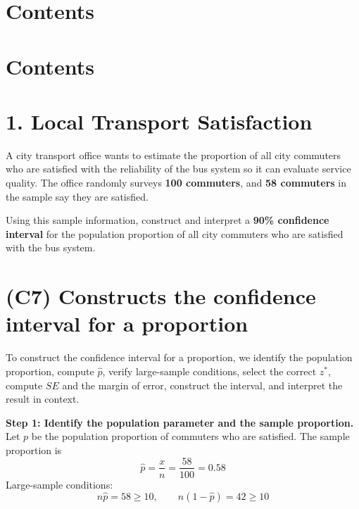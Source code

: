 


\section*{Contents}
\setcounter{tocdepth}{2}
\setcounter{secnumdepth}{1}
\section*{Contents}
\setcounter{tocdepth}{2}
\setcounter{secnumdepth}{1}
\tableofcontents
\section*{1. Local Transport Satisfaction}

A city transport office wants to estimate the proportion of all city commuters who are satisfied with the reliability of the bus system so it can evaluate service quality. The office randomly surveys \textbf{100 commuters}, and \textbf{58 commuters} in the sample say they are satisfied.

Using this sample information, construct and interpret a \textbf{90\% confidence interval} for the population proportion of all city commuters who are satisfied with the bus system.
	
	\section{(C7) Constructs the confidence interval for a proportion}
	To construct the confidence interval for a proportion, we identify the population proportion, compute \(\hat{p}\), verify large-sample conditions, select the correct \(z^*\), compute \(SE\) and the margin of error, construct the interval, and interpret the result in context.
	
	\textbf{Step 1: Identify the population parameter and the sample proportion.}
	Let \(p\) be the population proportion of commuters who are satisfied. The sample proportion is
	\[
	\hat{p} = \frac{x}{n} = \frac{58}{100} = 0.58
	\]
	Large-sample conditions:
	\[
	n\hat{p} = 58 \ge 10, \qquad n(1-\hat{p}) = 42 \ge 10
	\]
	

